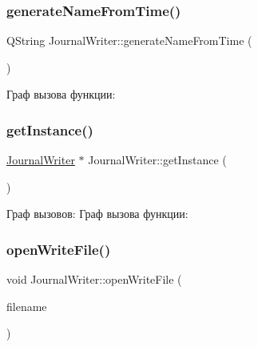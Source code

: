 \mbox{\label{class_journal_writer_a1762840b51e6631c7a6be80631e16e0e}} 
\subsubsection{\texorpdfstring{generate\+Name\+From\+Time()}{generateNameFromTime()}}
{\footnotesize\ttfamily Q\+String Journal\+Writer\+::generate\+Name\+From\+Time (\begin{DoxyParamCaption}{ }\end{DoxyParamCaption})\hspace{0.3cm}{\ttfamily [static]}}

Граф вызова функции\+:
\mbox{\label{class_journal_writer_adc9e15e0d3114eba2658afc48c4c44a4}} 
\subsubsection{\texorpdfstring{get\+Instance()}{getInstance()}}
{\footnotesize\ttfamily \hyperlink{class_journal_writer}{Journal\+Writer} $\ast$ Journal\+Writer\+::get\+Instance (\begin{DoxyParamCaption}{ }\end{DoxyParamCaption})\hspace{0.3cm}{\ttfamily [static]}}

Граф вызовов\+:
Граф вызова функции\+:
\mbox{\label{class_journal_writer_af4ffa24f865f9aaa383a3d361b24cc79}} 
\subsubsection{\texorpdfstring{open\+Write\+File()}{openWriteFile()}}
{\footnotesize\ttfamily void Journal\+Writer\+::open\+Write\+File (\begin{DoxyParamCaption}\item[{Q\+String}]{filename }\end{DoxyParamCaption})}

